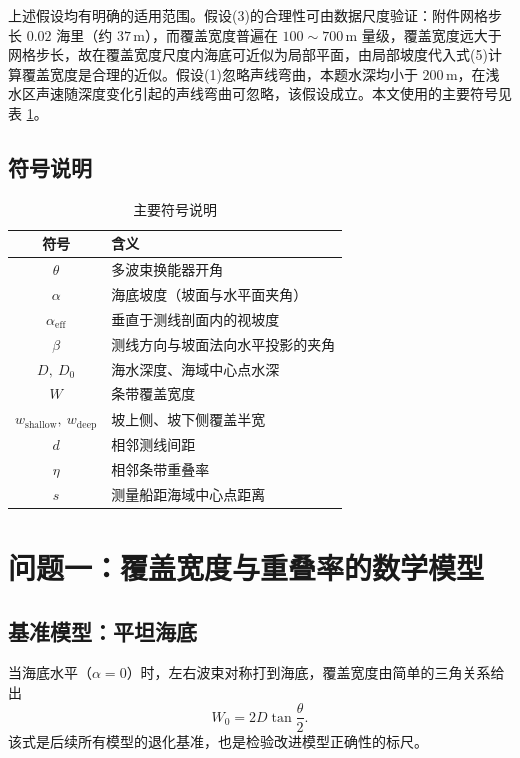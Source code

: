 \documentclass[12pt]{ctexart}
\begin{document}
上述假设均有明确的适用范围。假设(3)的合理性可由数据尺度验证：附件网格步长 $0.02$ 海里（约 $37\,\mathrm{m}$），而覆盖宽度普遍在 $100\sim700\,\mathrm{m}$ 量级，覆盖宽度远大于网格步长，故在覆盖宽度尺度内海底可近似为局部平面，由局部坡度代入式(5)计算覆盖宽度是合理的近似。假设(1)忽略声线弯曲，本题水深均小于 $200\,\mathrm{m}$，在浅水区声速随深度变化引起的声线弯曲可忽略，该假设成立。本文使用的主要符号见表 \ref{tab:sym}。

\subsection{符号说明}
\begin{table}[H]\centering
\caption{主要符号说明}
\label{tab:sym}
\begin{tabular}{cl}
\toprule
符号 & 含义 \\
\midrule
$\theta$ & 多波束换能器开角 \\
$\alpha$ & 海底坡度（坡面与水平面夹角） \\
$\alpha_{\mathrm{eff}}$ & 垂直于测线剖面内的视坡度 \\
$\beta$ & 测线方向与坡面法向水平投影的夹角 \\
$D,\ D_0$ & 海水深度、海域中心点水深 \\
$W$ & 条带覆盖宽度 \\
$w_{\mathrm{shallow}},\ w_{\mathrm{deep}}$ & 坡上侧、坡下侧覆盖半宽 \\
$d$ & 相邻测线间距 \\
$\eta$ & 相邻条带重叠率 \\
$s$ & 测量船距海域中心点距离 \\
\bottomrule
\end{tabular}
\end{table}

\section{问题一：覆盖宽度与重叠率的数学模型}

\subsection{基准模型：平坦海底}

当海底水平（$\alpha=0$）时，左右波束对称打到海底，覆盖宽度由简单的三角关系给出
\begin{equation}
W_0 = 2D\tan\frac{\theta}{2}.
\end{equation}
该式是后续所有模型的退化基准，也是检验改进模型正确性的标尺。
\end{document}
